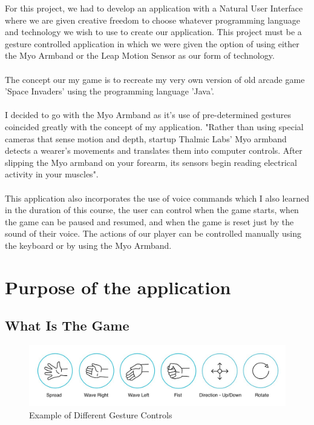 \documentclass{article}
\begin{document}
For this project, we had to develop an application with a Natural User Interface where we are given creative freedom to choose whatever programming language and technology we wish to use to create our application. This project must be a gesture controlled application in which we were given the option of using either the Myo Armband or the Leap Motion Sensor as our form of technology.\\ \\
The concept our my game is to recreate my very own version of old arcade game 'Space Invaders' using the programming language 'Java'.\\ \\
I decided to go with the Myo Armband as it's use of pre-determined gestures coincided greatly with the concept of my application. "Rather than using special cameras that sense motion and depth, startup Thalmic Labs' Myo armband detects a wearer's movements and translates them into computer controls. After slipping the Myo armband on your forearm, its sensors begin reading electrical activity in your muscles".\\ \\
This application also incorporates the use of voice commands which I also learned in the duration of this course, the user can control when the game starts, when the game can be paused and resumed, and when the game is reset just by the sound of their voice. The actions of our player can be controlled manually using the keyboard or by using the Myo Armband.

\section{Purpose of the application}

\subsection{What Is The Game}

\begin{figure}[h]
  \includegraphics[width=\textwidth]{img/gestures.jpg}
  \centering
  \caption{Example of Different Gesture Controls}
  \label{fig: Myo Armband Gesture Controls}
\end{figure}
\end{document}
